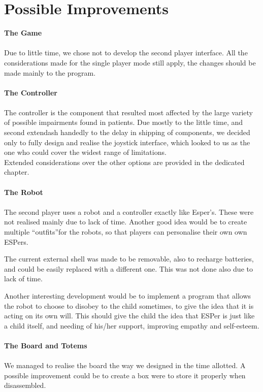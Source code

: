 \documentclass[a4paper,twoside]{book}
\begin{document}
\section{Possible Improvements}

\textbf{The Game}
\\
\\
Due to little time, we chose not to develop the second player interface. All the considerations made for the single player mode still apply, the changes should be made mainly to the program.
\\
\\
\textbf{The Controller}
\\
\\
The controller is the component that resulted most affected by the large variety of possible impairments found in patients. Due mostly to the little time, and second	extendash handedly to the delay in shipping of components, we decided only to fully design and realise the joystick interface, which looked to us as the one who could cover the widest range of limitations.
\\
Extended considerations over the other options are provided in the dedicated chapter.
\\
\\
\textbf{The Robot}
\\
\\
The second player uses a robot and a controller exactly like Esper's. These were not realised mainly due to lack of time. Another good idea would be to create multiple \textquotedblleft outfits\textquotedblright for the robots, so that players can  personalise their own own ESPers.

The current external shell was made to be removable, also to recharge batteries, and could be easily replaced with a different one. This was not done also due to lack of time. 

Another interesting development would be to implement a program that allows the robot to choose to disobey to the child sometimes, to give the idea that it is acting on its own will. This should give the child the idea that ESPer is just like a child itself, and needing of his/her support, improving empathy and self-esteem.
\\
\\
\textbf{The Board and Totems}
\\
\\
We managed to realise the board the way we designed in the time allotted. A possible improvement could be to create a box were to store it properly when disassembled. 
\end{document}
